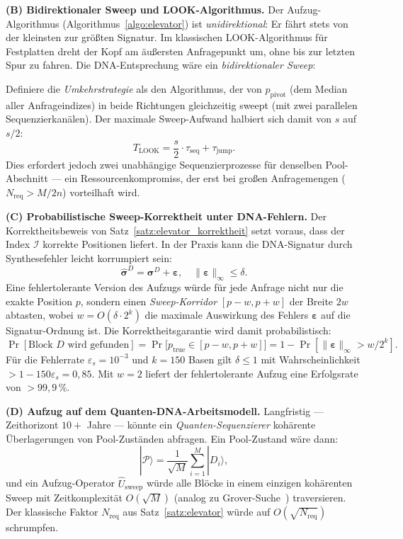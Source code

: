 ﻿\documentclass[a4paper,12pt]{article}
\theoremstyle{definition}
\theoremstyle{plain}
\begin{document}
\textbf{(B) Bidirektionaler Sweep und LOOK-Algorithmus.}
Der Aufzug-Algorithmus (Algorithmus~\ref{algo:elevator}) ist
\emph{unidirektional}: Er fährt stets von der kleinsten zur größten
Signatur.  Im klassischen LOOK-Algorithmus für Festplatten dreht der
Kopf am äußersten Anfragepunkt um, ohne bis zur letzten Spur zu fahren.
Die DNA-Entsprechung wäre ein \emph{bidirektionaler Sweep}:

Definiere die \emph{Umkehrstrategie} als den Algorithmus, der von
$p_{\mathrm{pivot}}$ (dem Median aller Anfrageindizes) in beide
Richtungen gleichzeitig sweept (mit zwei parallelen Sequenzierkanälen).
Der maximale Sweep-Aufwand halbiert sich damit von $s$ auf $s/2$:
\[
  T_{\mathrm{LOOK}} = \frac{s}{2} \cdot \tau_{\mathrm{seq}} + \tau_{\mathrm{jump}}.
\]
Dies erfordert jedoch zwei unabhängige Sequenzierprozesse für denselben
Pool-Abschnitt --- ein Ressourcenkompromiss, der erst bei großen
Anfragemengen ($N_{\mathrm{req}} > M/2n$) vorteilhaft wird.

\textbf{(C) Probabilistische Sweep-Korrektheit unter DNA-Fehlern.}
Der Korrektheitsbeweis von Satz~\ref{satz:elevator_korrektheit} setzt
voraus, dass der Index $\mathcal{I}$ korrekte Positionen liefert.
In der Praxis kann die DNA-Signatur durch Synthesefehler leicht
korrumpiert sein:
\[
  \hat{\boldsymbol{\sigma}}^D = \boldsymbol{\sigma}^D + \boldsymbol{\varepsilon},
  \quad \|\boldsymbol{\varepsilon}\|_\infty \le \delta.
\]
Eine fehlertolerante Version des Aufzugs würde für jede Anfrage nicht
nur die exakte Position $p$, sondern einen \emph{Sweep-Korridor}
$[p - w, p + w]$ der Breite $2w$ abtasten, wobei
$w = O(\delta \cdot 2^k)$ die maximale Aus\-wirkung des Fehlers
$\boldsymbol{\varepsilon}$ auf die Signatur-Ordnung ist.
Die Korrektheitsgaran\-tie wird damit probabilistisch:
\[
  \Pr[\text{Block } D \text{ wird gefunden}]
  = \Pr\bigl[p_{\mathrm{true}} \in [p - w, p + w]\bigr]
  = 1 - \Pr[\|\boldsymbol{\varepsilon}\|_\infty > w / 2^k].
\]
Für die Fehlerrate $\varepsilon_s = 10^{-3}$ und $k = 150$ Basen gilt
$\delta \le 1$ mit Wahrscheinlichkeit $> 1 - 150 \varepsilon_s = 0{,}85$.
Mit $w = 2$ liefert der fehlertolerante Aufzug eine Erfolgsrate von
$> 99{,}9\,\%$.

\textbf{(D) Aufzug auf dem Quanten-DNA-Arbeitsmodell.}
Langfristig --- Zeithorizont $10{+}$ Jahre --- könnte ein
\emph{Quanten-Sequenzierer} kohärente Überlagerungen von Pool-Zuständen
abfragen.  Ein Pool-Zustand wäre dann:
\[
  |\mathcal{P}\rangle = \frac{1}{\sqrt{M}} \sum_{i=1}^{M} |D_i\rangle,
\]
und ein Aufzug-Operator $\hat{U}_{\mathrm{sweep}}$ würde alle Blöcke
in einem einzigen kohärenten Sweep mit Zeitkomplexität $O(\sqrt{M})$
(analog zu Grover-Suche~\cite{grover1996}) traversieren.  Der
klassische Faktor $N_{\mathrm{req}}$ aus Satz~\ref{satz:elevator}
würde auf $O(\sqrt{N_{\mathrm{req}}})$ schrumpfen.
\end{document}
